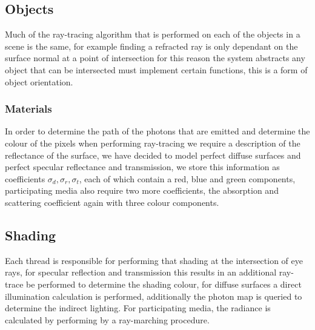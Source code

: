 \subsection{Objects}
Much of the ray-tracing algorithm that is performed on each of the
objects in a scene is the same, for example finding a refracted
ray is only dependant on the surface normal at a point of intersection
for this reason the system abstracts any object that can be intersected
must implement certain functions, this is a form of object orientation.

\subsubsection{Materials}
In order to determine the path of the photons that are emitted and determine the colour of the pixels when
performing ray-tracing we require a description of the reflectance of the surface, we have decided to model
perfect diffuse surfaces and perfect specular reflectance and transmission, we store this information
as coefficients $\sigma_d, \sigma_r, \sigma_t$, each of which contain a red, blue and green components, 
participating media also require two more coefficients, the absorption and scattering coefficient again
with three colour components.

\subsection{Shading}
Each thread is responsible for performing that shading at the intersection of eye rays, for specular reflection
and transmission this results in an additional ray-trace be performed to determine the shading colour, for diffuse
surfaces a direct illumination calculation is performed, additionally the photon map is queried to determine
the indirect lighting. For participating media, the radiance is calculated by performing by a ray-marching
procedure.
